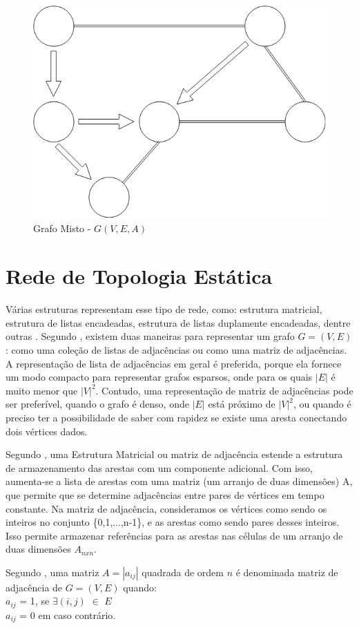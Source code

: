\begin{figure}[htbp]
\centering
 \includegraphics[width=.55\textwidth]{chapters/fig/misto1.png}
\caption{Grafo Misto - $G(V,E,A)$}
\label{fig:misto}
\end{figure}

\section{Rede de Topologia Estática}
Várias estruturas representam esse tipo de rede, como: estrutura matricial,
estrutura de listas encadeadas, estrutura de listas duplamente
encadeadas, dentre outras \cite{negreiros}.
Segundo \cite{cormen}, existem duas maneiras para representar um grafo $G = (V,E)$:
como uma coleção de listas de adjacências ou como uma matriz de adjacências. A representação
de lista de adjacências em geral é preferida, porque ela fornece um modo compacto para representar grafos esparsos,
onde para os quais $|E|$ é muito menor que $|V|^2$. Contudo, uma representação de matriz de adjacências pode ser
preferível, quando o grafo é denso, onde $|E|$ está próximo de $|V|^2$, ou quando é preciso ter a possibilidade
de saber com rapidez se existe uma aresta conectando dois vértices dados.

Segundo \cite{goodrich}, uma Estrutura Matricial ou matriz de adjacência estende a estrutura de armazenamento
das arestas com um componente adicional. Com isso, aumenta-se a lista de arestas com uma matriz (um arranjo de duas dimensões) A,
que permite que se determine adjacências entre pares de vértices em tempo constante. Na matriz de adjacência,
consideramos os vértices como sendo os inteiros no conjunto \{0,1,...,n-1\}, e as arestas como sendo pares desses inteiros.
Isso permite armazenar referências para as arestas nas células de um arranjo de duas dimensões $A_{n x n}$.

Segundo \cite{goldbarg}, uma matriz $A = |a_{ij}|$ quadrada de ordem $n$ é denominada matriz de adjacência de $G = (V, E)$ quando:\\
\indent $a_{ij}$ = 1, se $\exists(i,j)$ $\in$ $E$\\
\indent $a_{ij}$ = 0 em caso contrário.

